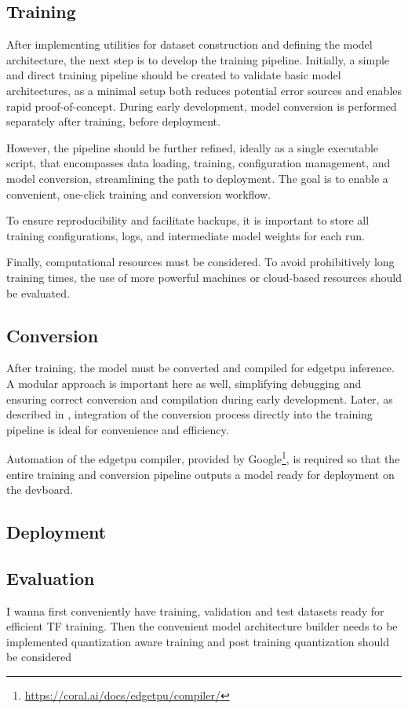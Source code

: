 {\subsection*{Training}
\label{subsec:designtrain}

After implementing utilities for dataset construction and defining the model architecture, the next step is to develop the training pipeline.
Initially, a simple and direct training pipeline should be created to validate basic model architectures, as a minimal setup both reduces potential error sources and enables rapid proof-of-concept.
During early development, model conversion is performed separately after training, before deployment.

However, the pipeline should be further refined, ideally as a single executable script, that encompasses data loading, training, configuration management, and model conversion,
streamlining the path to deployment. The goal is to enable a convenient, one-click training and conversion workflow.

To ensure reproducibility and facilitate backups, it is important to store all training configurations, logs, and intermediate model weights for each run.

Finally, computational resources must be considered. To avoid prohibitively long training times, the use of more powerful machines or cloud-based resources should be evaluated.

\subsection*{Conversion}

After training, the model must be converted and compiled for \gls{edgetpu} inference.
A modular approach is important here as well, simplifying debugging and ensuring correct conversion and compilation during early development.
Later, as described in , integration of the conversion process directly into the training pipeline is ideal for convenience and efficiency.

Automation of the \gls{edgetpu} compiler,
provided by Google\footnote{\url{https://coral.ai/docs/edgetpu/compiler/}},
is required so that the entire training and conversion pipeline outputs a model ready for deployment on the \gls{devboard}.

\subsection*{Deployment}
\label{subsec:designdep}



\subsection*{Evaluation}
I wanna first conveniently have training, validation and test datasets ready for efficient TF training.
Then the convenient model architecture builder needs to be implemented
quantization aware training and post training quantization should be considered

}